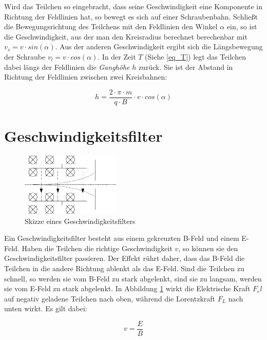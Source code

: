 Wird das Teilchen so eingebracht, dass seine Geschwindigkeit eine Komponente in Richtung der Feldlinien hat, so bewegt es sich auf einer Schraubenbahn. Schließt die Bewegungsrichtung des Teilchens mit den Feldlinien den Winkel \(\alpha\) ein, so ist die Geschwindigkeit, aus der man den Kreisradius berechnet berechenbar mit \(v_s = v \cdot sin(\alpha)\). Aus der anderen Geschwindigkeit ergibt sich die Längsbewegung der Schraube \(v_l = v \cdot cos(\alpha)\). In der Zeit \(T\) (Siehe \ref{eq_T}) legt das Teilchen dabei längs der Feldlinien die \textit{Ganghöhe} \(h\) zurück. Sie ist der Abstand in Richtung der Feldlinien zwischen zwei Kreisbahnen:

\begin{equation}
h =  \frac{2 \cdot \pi \cdot m}{q \cdot B} \cdot v \cdot cos(\alpha)
\end{equation}

		\section{Geschwindigkeitsfilter}
		\label{geschf}

\begin{figure}[htbp]
	\centering
		\includegraphics[width=0.42\textwidth]{mat/geschwindigkeitsfilter}
	\caption{Skizze eines Geschwindigkeitsfilters}
	\label{fig:f}
\end{figure}
		
Ein Geschwindigkeitsfilter besteht aus einem gekreuzten B-Feld und einem E-Feld. Haben die Teilchen die richtige Geschwindigkeit \(v\), so können sie den Geschwindigkeitsfilter passieren. Der Effekt rührt daher, dass das B-Feld die Teilchen in die andere Richtung ablenkt als das E-Feld. Sind die Teilchen zu schnell, so werden sie vom B-Feld zu stark abgelenkt, sind sie zu langsam, werden sie vom E-Feld zu stark abgelenkt. In Abbildung \ref{fig:f} wirkt die Elektrische Kraft \(F_el\) auf negativ geladene Teilchen nach oben, während die Lorentzkraft \(F_L\) nach unten wirkt. Es gilt dabei:

\begin{equation}
v = \frac{E}{B}
\end{equation}


